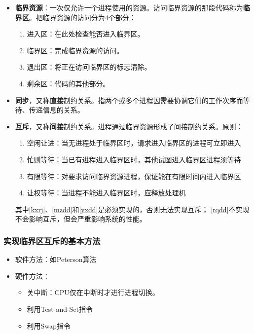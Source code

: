 \documentclass[12pt, a4paper, oneside]{ctexart}
\begin{document}
\begin{itemize}
  \item {\bf 临界资源}：一次仅允许一个进程使用的资源。访问临界资源的那段代码称为\textbf{临界区}。把临界资源的访问分为4个部分：
  \begin{enumerate}
    \item 进入区：在此处检查能否进入临界区。
    \item 临界区：完成临界资源的访问。
    \item 退出区：将正在访问临界区的标志清除。
    \item 剩余区：代码的其他部分。
  \end{enumerate}
  \item {\bf 同步}，又称\textbf{直接}制约关系。指两个或多个进程因需要协调它们的工作次序而等待、传递信息的关系。
  \item {\bf 互斥}，又称\textbf{间接}制约关系。进程通过临界资源形成了间接制约关系。原则：
  \begin{enumerate}
    \item \label{kxrj}空闲让进：当无进程处于临界区时，请求进入临界区的进程可立即进入
    \item \label{mzdd}忙则等待：当已有进程进入临界区时，其他试图进入临界区进程须等待
    \item \label{yxdd}有限等待：对要求访问临界资源进程，保证能在有限时间内进入临界区
    \item \label{rqdd}让权等待：当进程不能进入临界区时，应释放处理机
\end{enumerate}

其中\ref{kxrj}、\ref{mzdd}和\ref{yxdd}是必须实现的，否则无法实现互斥；
\ref{rqdd}不实现不会影响互斥，但会严重影响系统的性能。
\end{itemize}

\subsubsection{实现临界区互斥的基本方法}

\begin{itemize}
  \item 软件方法：如Peterson算法
  \item 硬件方法：
  \begin{itemize}
      \item 关中断：CPU仅在中断时才进行进程切换。
      \item 利用Test-and-Set指令
      \item 利用Swap指令
  \end{itemize}
\end{itemize}
\end{document}
